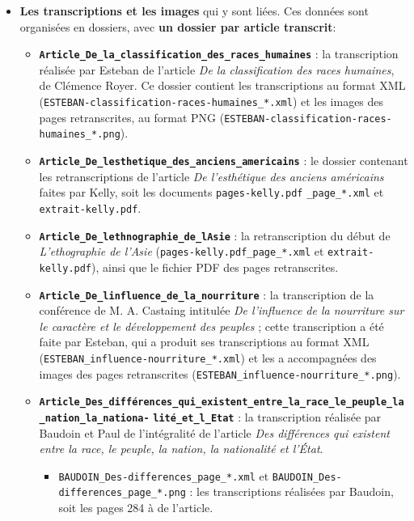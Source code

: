 \documentclass{article}
\begin{document}
	\begin{itemize}
		\item \textbf{Les transcriptions et les images} qui y sont liées. Ces données sont organisées en dossiers, avec \textbf{un dossier par article transcrit}:
		\begin{itemize}
			\item \textbf{\texttt{Article\_De\_la\_classification\_des\_races\_humaines}} : la transcription réalisée par Esteban de l'article \textit{De la classification des races humaines}, de Clémence Royer. Ce dossier contient les transcriptions au format XML (\texttt{ESTEBAN-classification-races-humaines\_*.xml}) et les images des pages retranscrites, au format PNG (\texttt{ESTEBAN-classification-races-humaines\_*.png}).
			\item \textbf{\texttt{Article\_De\_lesthetique\_des\_anciens\_americains}} : le dossier contenant les retranscriptions de l'article \textit{De l'esthétique des anciens américains} faites par Kelly, soit les documents \texttt{pages-kelly.pdf}
			\noindent \texttt{\_page\_*.xml} et \texttt{extrait-kelly.pdf}.
			\item \textbf{\texttt{Article\_De\_lethnographie\_de\_lAsie}} : la retranscription du début de \textit{L'ethographie de l'Asie} (\texttt{pages-kelly.pdf\_page\_*.xml} et \texttt{extrait-kelly.pdf}), ainsi que le fichier PDF des pages retranscrites.
			\item \textbf{\texttt{Article\_De\_linfluence\_de\_la\_nourriture}} : la transcription de la conférence de M. A. Castaing intitulée \textit{De l'influence de la nourriture sur le caractère et le développement des peuples} ; cette transcription a été faite par Esteban, qui a produit ses transcriptions au format XML (\texttt{ESTEBAN\_influence-nourriture\_*.xml}) et les a accompagnées des images des pages retranscrites (\texttt{ESTEBAN\_influence-nourriture\_*.png}).
			\item \textbf{\texttt{Article\_Des\_différences\_qui\_existent\_entre\_la\_race\_le\_peuple\_la\_nation\_la\_nationa-}}
			\noindent \textbf{\texttt{lité\_et\_l\_Etat}} : la transcription réalisée par Baudoin et Paul de l'intégralité de l'article \textit{Des différences qui existent entre la race, le peuple, la nation, la nationalité et l'État}.
			\begin{itemize}
				\item \texttt{BAUDOIN\_Des-differences\_page\_*.xml} et \texttt{BAUDOIN\_Des-differences\_page\_*.png} : les transcriptions réalisées par Baudoin, soit les pages 284 à de l'article.

\end{itemize}
\end{itemize}
\end{itemize}
\end{document}
